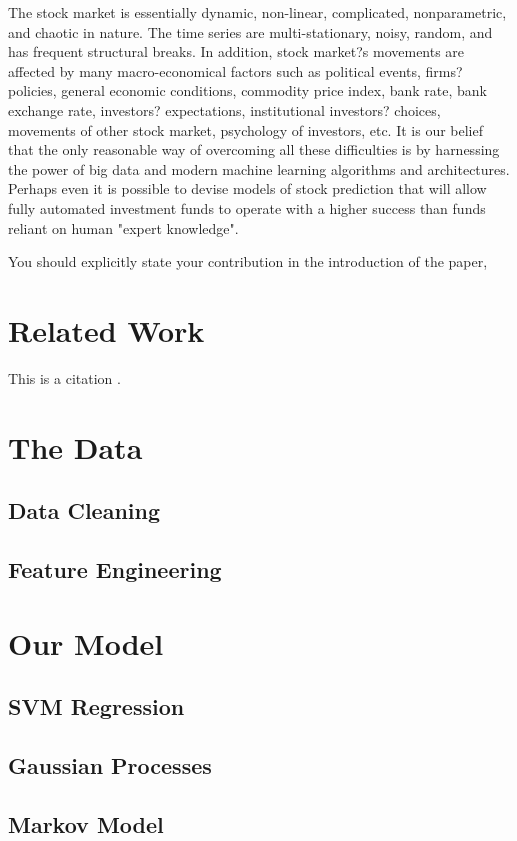 \documentclass{article}
\def\blu#1{{\color{blu}#1}}
\begin{document}
The stock market is essentially dynamic, non-linear, complicated, nonparametric, and chaotic in nature. The time series are multi-stationary, noisy, random, and has frequent structural breaks. In addition, stock market?s movements are affected by many macro-economical factors such as political events, firms? policies, general economic conditions, commodity price index, bank rate, bank exchange rate, investors? expectations, institutional investors? choices, movements of other stock market, psychology of investors, etc. It is our belief that the only reasonable way of overcoming all these difficulties is by harnessing the power of big data and modern machine learning algorithms and architectures. Perhaps even it is possible to devise models of stock prediction that will allow fully automated investment funds to operate with a higher success than funds reliant on human "expert knowledge".

\blu{You should explicitly state your contribution in the introduction of the paper,}

\section{Related Work}

This is a citation \cite{vapnik1999overview}.

\section{The Data}
\subsection{Data Cleaning}
\subsection{Feature Engineering}

\section{Our Model}
\subsection{SVM Regression}
\subsection{Gaussian Processes}
\subsection{Markov Model}
\end{document}
